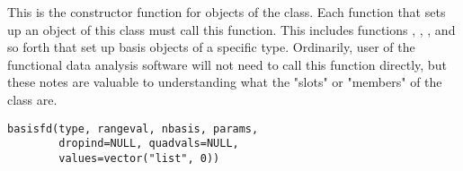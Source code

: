 \begin{Description}\relax
This is the constructor function for objects of the 
class.  Each function that sets up an object of this class must call
this function.  This includes functions ,
, , and so
forth that set up basis objects of a specific type.  Ordinarily, user
of the functional data analysis software will not need to call this
function directly, but these notes are valuable to understanding what
the "slots" or "members" of the  class are.
\end{Description}
\begin{Usage}
\begin{verbatim}
basisfd(type, rangeval, nbasis, params,
        dropind=NULL, quadvals=NULL,
        values=vector("list", 0))
\end{verbatim}
\end{Usage}
